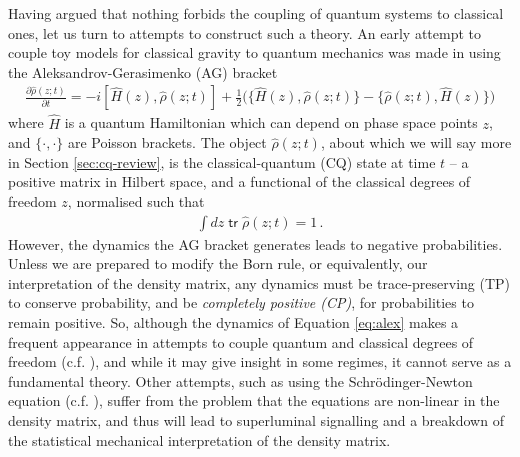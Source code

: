 \documentclass[aps,pra,showpacs,citeautoscript,amsmath,amssymb,floatfix,superscriptaddress,bbm, verbatim,amsfonts,changes,12pt,nofootinbib,longbibliography]{revtex4-2}
\newcommand{\tr}{\mathop{\mathsf{tr}}\nolimits}
\def\z{{z}}
\def\Hq{\hat{H}}
\renewcommand{\varrho}{\hat{\rho}}
\def\psiz{{\varrho(\z;t)}}
\def\PB{\}}
\begin{document}
Having argued that nothing forbids the coupling of quantum systems to classical ones, let us turn to attempts to construct such a theory.
An early attempt to couple toy models for classical gravity to quantum mechanics was made in \cite{boucher1988semiclassical}
using the Aleksandrov-Gerasimenko (AG) bracket\cite{aleksandrov1981statistical,gerasimenko1982dynamical} 
\begin{align}
\frac{\partial \psiz}{\partial t}
=
-i[\Hq(\z),\psiz]+\frac{1}{2}\Big(\{\Hq(\z),\psiz\PB-\{\psiz,\Hq(\z)\PB\Big)
\label{eq:alex}
\end{align}
where $\hat{H}$ is a quantum Hamiltonian which can depend on phase space points $\z$, and $\{\cdot,\cdot\}$ are Poisson brackets. The object $\psiz$, about which we will say more in Section \ref{sec:cq-review}, is the classical-quantum (CQ) state at time $t$ -- a positive matrix in Hilbert space, and a functional of the classical degrees of freedom $\z$, normalised such that
\begin{align}
\int d\z \tr\psiz=1\,.
\label{eq:normalisation}
\end{align}
However, 
the dynamics the AG bracket generates leads to negative probabilities\cite{boucher1988semiclassical,diosi2000quantum}. Unless we are prepared to modify the Born rule, or equivalently, our interpretation of the density matrix, any dynamics must be trace-preserving (TP) to conserve probability, and be {\it completely positive (CP)}, for probabilities to remain positive. So, although the dynamics of Equation \eqref{eq:alex} makes a frequent appearance in attempts to couple quantum and classical degrees of freedom 
\cite{anderson1995quantum,kapral1999mixed,kapral2006progress} (c.f. \cite{prezhdo1997mixing}), and while it may give insight in some regimes, it cannot serve as a fundamental theory. 
Other attempts, such as using the Schr\"odinger-Newton equation\cite{diosi1987universal,penrose1998quantum} (c.f. \cite{pitaevskii1961vortex,gross1961structure}), suffer from the problem that the equations are non-linear in the density matrix, and thus will lead to superluminal signalling\cite{gisin1989stochastic,gisin1990weinberg,polchinski1991weinberg} and a breakdown of the statistical mechanical interpretation of the density matrix\cite{matrix_foot}.\label{par:antag2}
\end{document}
